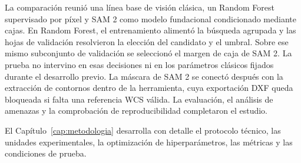 La comparación reunió una línea base de visión clásica, un Random Forest supervisado por píxel y SAM 2 como modelo fundacional condicionado mediante cajas. En Random Forest, el entrenamiento alimentó la búsqueda agrupada y las hojas de validación resolvieron la elección del candidato y el umbral. Sobre ese mismo subconjunto de validación se seleccionó el margen de caja de SAM 2. La prueba no intervino en esas decisiones ni en los parámetros clásicos fijados durante el desarrollo previo. La máscara de SAM 2 se conectó después con la extracción de contornos dentro de la herramienta, cuya exportación DXF queda bloqueada si falta una referencia WCS válida. La evaluación, el análisis de amenazas y la comprobación de reproducibilidad completaron el estudio.

El Capítulo~\ref{cap:metodologia} desarrolla con detalle el protocolo técnico, las unidades experimentales, la optimización de hiperparámetros, las métricas y las condiciones de prueba.
